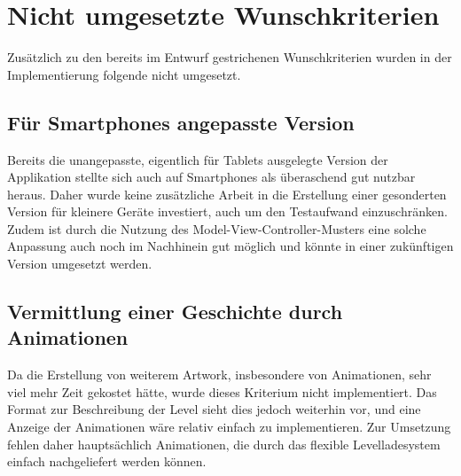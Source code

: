 \section{Nicht umgesetzte Wunschkriterien}

Zusätzlich zu den bereits im Entwurf gestrichenen Wunschkriterien wurden in der Implementierung folgende nicht umgesetzt.

\subsection{Für Smartphones angepasste Version}

Bereits die unangepasste, eigentlich für Tablets ausgelegte Version der Applikation stellte sich auch auf Smartphones als überaschend gut nutzbar heraus.
Daher wurde keine zusätzliche Arbeit in die Erstellung einer gesonderten Version für kleinere Geräte investiert, auch um den Testaufwand einzuschränken.
Zudem ist durch die Nutzung des Model-View-Controller-Musters eine solche Anpassung auch noch im Nachhinein gut möglich und könnte in einer zukünftigen Version umgesetzt werden.

\subsection{Vermittlung einer Geschichte durch Animationen}

Da die Erstellung von weiterem Artwork, insbesondere von Animationen, sehr viel mehr Zeit gekostet hätte, wurde dieses Kriterium nicht implementiert.
Das Format zur Beschreibung der Level sieht dies jedoch weiterhin vor, und eine Anzeige der Animationen wäre relativ einfach zu implementieren.
Zur Umsetzung fehlen daher hauptsächlich Animationen, die durch das flexible Levelladesystem einfach nachgeliefert werden können.

